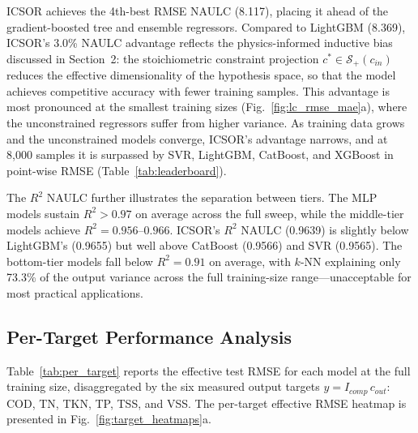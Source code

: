 \documentclass[11pt]{article}
\begin{document}
ICSOR achieves the 4th-best RMSE NAULC (8.117), placing it ahead of the gradient-boosted tree and ensemble regressors. Compared to LightGBM (8.369), ICSOR's 3.0\% NAULC advantage reflects the physics-informed inductive bias discussed in Section~2: the stoichiometric constraint projection $c^* \in \mathcal{S}_+(c_{in})$ reduces the effective dimensionality of the hypothesis space, so that the model achieves competitive accuracy with fewer training samples. This advantage is most pronounced at the smallest training sizes (Fig.~\ref{fig:lc_rmse_mae}a), where the unconstrained regressors suffer from higher variance. As training data grows and the unconstrained models converge, ICSOR's advantage narrows, and at 8{,}000 samples it is surpassed by SVR, LightGBM, CatBoost, and XGBoost in point-wise RMSE (Table~\ref{tab:leaderboard}).

The $R^2$ NAULC further illustrates the separation between tiers. The MLP models sustain $R^2 > 0.97$ on average across the full sweep, while the middle-tier models achieve $R^2 = 0.956$--$0.966$. ICSOR's $R^2$ NAULC (0.9639) is slightly below LightGBM's (0.9655) but well above CatBoost (0.9566) and SVR (0.9565). The bottom-tier models fall below $R^2 = 0.91$ on average, with $k$-NN explaining only 73.3\% of the output variance across the full training-size range---unacceptable for most practical applications.

\subsection{Per-Target Performance Analysis}

Table~\ref{tab:per_target} reports the effective test RMSE for each model at the full training size, disaggregated by the six measured output targets $y = I_{comp}\,c_{out}$: COD, TN, TKN, TP, TSS, and VSS. The per-target effective RMSE heatmap is presented in Fig.~\ref{fig:target_heatmaps}a.
\end{document}
